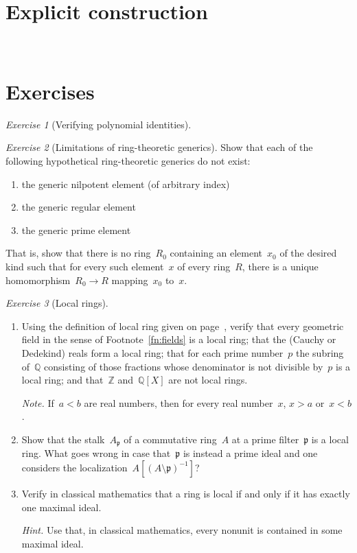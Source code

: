\documentclass[10pt,reqno,a4paper,openany]{amsbook}
\theoremstyle{definition}
\theoremstyle{plain}
\theoremstyle{remark}
\newcommand{\ZZ}{\mathbb{Z}}
\newcommand{\QQ}{\mathbb{Q}}
\newcommand{\ppp}{\mathfrak{p}}
\newcommand{\?}{\,{:}\,}
\renewcommand{\_}{\mathpunct{.}\,}
\newtheorem{exercise}{Exercise}[chapter]
\begin{document}
\section{Explicit construction}
\newpage
\ \newpage

\section{Exercises}

\begin{exercise}[Verifying polynomial identities]

\end{exercise}

\begin{exercise}[Limitations of ring-theoretic generics]
Show that each of the following hypothetical ring-theoretic generics do not
exist:
\begin{enumerate}
\item the generic nilpotent element (of arbitrary index)
\item the generic regular element
\item the generic prime element
\end{enumerate}
That is, show that there is no ring~$R_0$ containing an element~$x_0$ of the
desired kind such that for every such element~$x$ of every ring~$R$, there is a
unique homomorphism~$R_0 \to R$ mapping~$x_0$ to~$x$.
\end{exercise}

\begin{exercise}[Local rings]\label{ex:local-rings}
\begin{enumerate}
\item Using the definition of local ring given on
page~\pageref{page:local-rings}, verify that every geometric field in the sense
of Footnote~\ref{fn:fields} is a local ring; that the (Cauchy or Dedekind)
reals form a local ring; that for each prime number~$p$ the subring of~$\QQ$
consisting of those fractions whose denominator is not divisible by~$p$ is a
local ring; and that~$\ZZ$ and~$\QQ[X]$ are not local rings.

{\noindent\scriptsize\emph{Note.} If~$a < b$ are real numbers, then for every
real number~$x$, $x > a$ or~$x < b$.\par}

\item Show that the stalk~$A_\ppp$ of a commutative ring~$A$ at a prime
filter~$\ppp$ is a local ring. What goes wrong in case that~$\ppp$ is instead a
prime ideal and one considers the localization~$A[(A\setminus\ppp)^{-1}]$?

\item Verify in classical mathematics that a ring is local if and only if it
has exactly one maximal ideal.

{\noindent\scriptsize\emph{Hint.} Use that, in classical mathematics, every
nonunit is contained in some maximal ideal.\par}
\end{enumerate}
\end{exercise}
\end{document}
